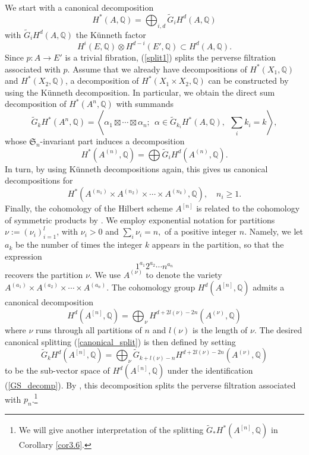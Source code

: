 \documentclass[11pt]{amsart}
\theoremstyle{plain}
\theoremstyle{definition}
\theoremstyle{remark}
\newcommand{\BQ}{{\mathbb{Q}}}
\begin{document}
We start with a canonical decomposition 
\begin{equation}\label{split1}
    H^*(A, \BQ) = \bigoplus_{i,d} \widetilde{G}_iH^d(A, \BQ)
\end{equation}
with $\widetilde{G}_iH^d(A, \BQ)$ the K\"unneth factor 
\[
H^i(E, \BQ) \otimes H^{d-i}(E',\BQ) \subset H^d(A, \BQ).
\]
Since $p: A\to E'$ is a trivial fibration, (\ref{split1}) splits the perverse filtration associated with $p$. Assume that we already have decompositions of $H^*(X_1, \BQ)$ and $H^*(X_2, \BQ)$, a decomposition of $H^\ast(X_1 \times X_2, \BQ)$ can be constructed by using the K\"unneth decomposition. In particular, we obtain the direct sum decomposition of $H^*(A^n, \BQ)$ with summands
\[
\widetilde{G}_kH^*(A^n, \BQ)= \left \langle \alpha_1 \boxtimes \cdots \boxtimes \alpha_n;~~ \alpha \in \widetilde{G}_{k_i}H^*(A, \BQ),~~ \sum_{i} {k_i} = k   \right \rangle,
\]
whose $\mathfrak{S}_n$-invariant part induces a decomposition 
\[
H^*(A^{(n)}, \BQ) = \bigoplus \widetilde{G}_iH^d(A^{(n)}, \BQ).
\]
In turn, by using  K\"unneth decompositions again, this gives us  canonical decompositions for
\[
H^\ast(A^{(n_1)}\times A^{(n_2)} \times \cdots \times A^{(n_k)}, \BQ), \quad n_i \geq 1.
\]
Finally, the cohomology of the Hilbert scheme $A^{[n]}$ is related to the cohomology of symmetric products by \cite{Go2, dCM3}.  We employ exponential notation for partitions $\nu:= (\nu_i)_{i=1}^l$, with  $\nu_i >0$ and
$\sum_i \nu_i =n,$ of a positive integer $n$. Namely, we let $a_k$ be the number of times the integer $k$ appears
in the partition, so that the expression 
\[
1^{a_1}2^{a_2}\cdots n^{a_n}\]
 recovers the partition $\nu$.
We use $A^{(\nu)}$ to denote the variety $A^{(a_1)} \times A^{(a_2)} \times \cdots \times A^{(a_n)}$. The cohomology group $H^d(A^{[n]}, \BQ)$ admits a canonical decomposition
\begin{equation}\label{GS_decomp}
H^d(A^{[n]}, \BQ) = \bigoplus_{\nu} H^{d+2l(\nu)-2n}(A^{(\nu)}, \BQ)
\end{equation}
where $\nu$ runs through all partitions of $n$ and $l(\nu)$ is the length of $\nu$. 
The desired canonical splitting (\ref{canonical_split}) is then defined by setting
\begin{equation}\label{cansplitting15}
\widetilde{G}_kH^d(A^{[n]}, \BQ) = \bigoplus_{\nu} \widetilde{G}_{k+l(\nu)-n}H^{d+2l(\nu)-2n}(A^{(\nu)}, \BQ)
\end{equation}
to be the sub-vector space of $H^d(A^{[n]}, \BQ)$ under the identification (\ref{GS_decomp}). By \cite[Proposition 4.12]{Z}, this decomposition splits the perverse filtration associated with $p_n$.\footnote{We will give another interpretation of the splitting $\tilde{G}_*H^*(A^{[n]},\BQ)$ in Corollary \ref{cor3.6}.}
\end{document}
